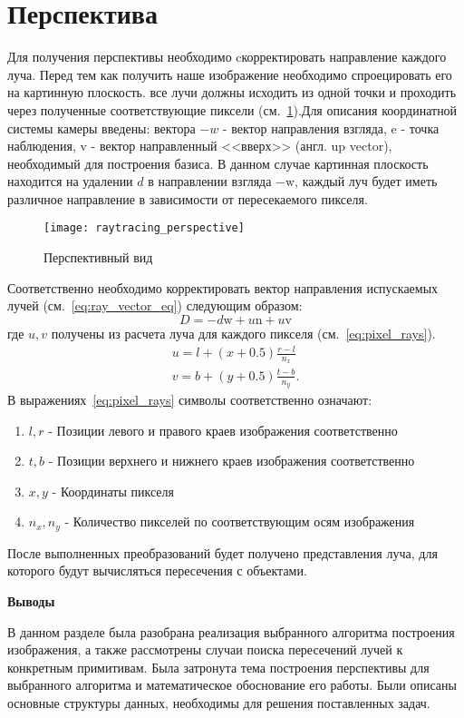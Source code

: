 \section{Перспектива}
Для получения перспективы необходимо cкорректировать направление каждого луча. Перед тем как получить наше изображение необходимо спроецировать его на картинную плоскость.
все лучи должны исходить из одной точки и проходить через полученные соответствующие пиксели (см.~\ref{img:perspective_view}).Для описания координатной системы камеры введены:
вектора $-w$ - вектор направления взгляда, $\mathrm{e}$ - точка наблюдения, $\mathrm{v}$ - вектор направленный <<вверх>> (англ. up vector), необходимый для построения базиса.
В данном случае картинная плоскость находится на удалении $d$ в направлении взгляда $\mathrm{-w}$, каждый луч будет иметь различное направление в зависимости от пересекаемого пикселя.
\begin{figure}[H]
	\centering
	\texttt{[image: raytracing\_perspective]}
	\caption{Перспективный вид}
	\label{img:perspective_view}
\end{figure}
Соответственно необходимо корректировать вектор направления испускаемых лучей (см.~\ref{eq:ray_vector_eq}) следующим образом:
\begin{equation}
	D = -d\mathrm{w} + u\mathrm{n} + u\mathrm{v}
\end{equation}
где $u,v$ получены из расчета луча для каждого пикселя (см.~\ref{eq:pixel_rays}).
\begin{equation}
	\begin{aligned}
		u = l + (x + 0.5)\frac{r - l}{n_x}\\
		v = b + (y + 0.5)\frac{t - b}{n_y}.
	\end{aligned}
	\label{eq:pixel_rays}
\end{equation}
В выражениях~\ref{eq:pixel_rays} символы соответственно означают:
\begin{enumerate}
	\item $l,r$ - Позиции левого  и правого краев изображения соответственно
	\item $t,b$ - Позиции верхнего и нижнего краев изображения соответственно
	\item $x,y$ - Координаты пикселя
	\item $n_x,n_y$ - Количество пикселей по соответствующим осям изображения
\end{enumerate}

После выполненных преобразований будет получено представления луча, для которого будут вычисляться
пересечения с объектами.\cite{perspective_raytracing}



\textbf{Выводы}

В данном разделе была разобрана реализация выбранного алгоритма построения изображения, а также рассмотрены случаи поиска пересечений лучей  к конкретным примитивам. 
Была затронута тема построения перспективы для выбранного алгоритма и математическое обоснование его работы. Были описаны основные структуры данных, необходимы для решения поставленных задач.




